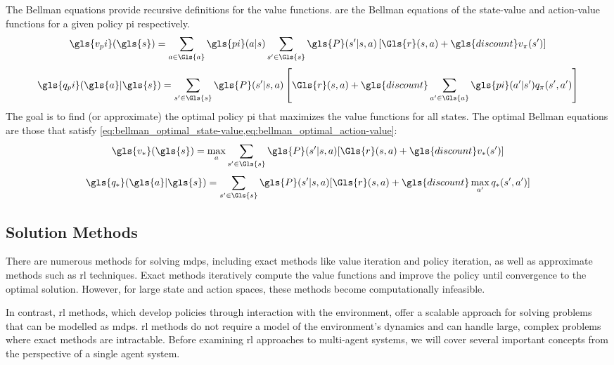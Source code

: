 The Bellman equations provide recursive definitions for the value functions. 
 are the Bellman equations
of the state-value and action-value functions for a given policy \gls{pi} 
respectively.
\begin{equation}
    \gls{v_pi}(\gls{s}) 
    = \sum_{a \in \Gls{a}} \gls{pi}(a|s) 
      \sum_{s^\prime \in \Gls{s}} \gls{P}(s^\prime|s, a) \left[
        \Gls{r}(s, a) + \gls{discount} v_\pi(s^\prime)\right]
    \label{eq:bellman_state-value}
\end{equation} \begin{equation}
    \gls{q_pi}(\gls{a}|\gls{s}) 
    = \sum_{s^\prime \in \Gls{s}} \gls{P}(s^\prime|s, a) \left[
        \Gls{r}(s, a) + \gls{discount} \sum_{a^\prime \in \Gls{a}} 
        \gls{pi}(a^\prime|s^\prime) q_\pi(s^\prime, a^\prime)\right]
    \label{eq:bellman_action-value} 
    \vspace*{1em}
\end{equation}
The goal is to find (or approximate) the optimal policy \gls{pi} that maximizes
the value functions for all states. The optimal Bellman equations are those that
satisfy \cref*{eq:bellman_optimal_state-value,eq:bellman_optimal_action-value}:
\begin{equation}
    \gls{v_*}(\gls{s}) = \max_a \sum_{s^\prime \in \Gls{s}} \gls{P}(s^\prime|s, a)
    [\Gls{r}(s, a) + \gls{discount} v_*(s^\prime)]
    \label{eq:bellman_optimal_state-value}
\end{equation} \begin{equation}
    \gls{q_*}(\gls{a}|\gls{s}) = \sum_{s^\prime \in \Gls{s}} \gls{P}(s^\prime|s, a) 
    [\Gls{r}(s, a) + \gls{discount} \max_{a^\prime} q_*(s^\prime, a^\prime)]
    \label{eq:bellman_optimal_action-value}
\end{equation}

    \subsection*{Solution Methods}%

There are numerous methods for solving \glspl{mdp}, including exact methods 
like value iteration and policy iteration, as well as approximate methods 
such as \gls{rl} techniques. Exact methods iteratively compute the value 
functions and improve the policy until convergence to the optimal solution. 
However, for large state and action spaces, 
these methods become computationally infeasible.

In contrast, \gls{rl} methods, which develop policies through interaction
with the environment, offer a scalable approach for solving problems that
can be modelled as \glspl{mdp}. 
\Gls{rl} methods do not require a model of the environment's dynamics and can
handle large, complex problems where exact methods are intractable.
Before examining \gls{rl} approaches to multi-agent systems, we will cover 
several important concepts from the perspective of a single agent system.


